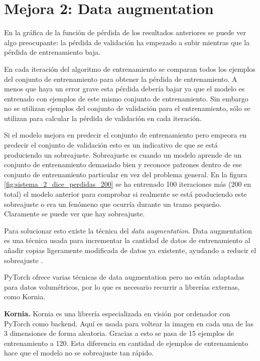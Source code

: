 \chapter{Mejora 2: Data augmentation}\label{data_augmentation}

En la gráfica de la función de pérdida de los resultados anteriores se puede ver algo preocupante: la pérdida de validación ha empezado a subir mientras que la pérdida de entrenamiento baja.

En cada iteración del algoritmo de entrenamiento se comparan todos los ejemplos del conjunto de entrenamiento para obtener la pérdida de entrenamiento. A menos que haya un error grave esta pérdida debería bajar ya que el modelo es entrenado con ejemplos de este mismo conjunto de entrenamiento. Sin embargo no se utilizan ejemplos del conjunto de validación para el entrenamiento, sólo se utilizan para calcular la pérdida de validación en cada iteración.

Si el modelo mejora en predecir el conjunto de entrenamiento pero empeora en predecir el conjunto de validación esto es un indicativo de que se está produciendo un sobreajuste. Sobreajuste es cuando un modelo aprende de un conjunto de entrenamiento demasiado bien y reconoce patrones dentro de ese conjunto de entrenamiento particular en vez del problema general. En la figura \ref{fig:sistema_2_dice_perdidas_200} se ha entrenado 100 iteraciones más (200 en total) el modelo anterior para comprobar si realmente se está produciendo este sobreajuste o era un fenómeno que ocurría durante un tramo pequeño. Claramente se puede ver que hay sobreajuste.


Para solucionar esto existe la técnica del \textit{data augmentation}. Data augmentation es una técnica usada para incrementar la cantidad de datos de entrenamiento al añadir copias ligeramente modificada de datos ya existente, ayudando a reducir el sobreajuste \cite{Shorten2019}.

PyTorch ofrece varias técnicas de data augmentation pero no están adaptadas para datos volumétricos, por lo que es necesario recurrir a librerías externas, como Kornia.

\textbf{Kornia.} Kornia \cite{ERiba2020} es una librería especializada en visión por ordenador con PyTorch como backend. Aquí es usada para voltear la imagen en cada una de las 3 dimensiones de forma aleatoria. Gracias a esto se pasa de 15 ejemplos de entrenamiento a 120. Esta diferencia en cantidad de ejemplos de entrenamiento hace que el modelo no se sobreajuste tan rápido.

